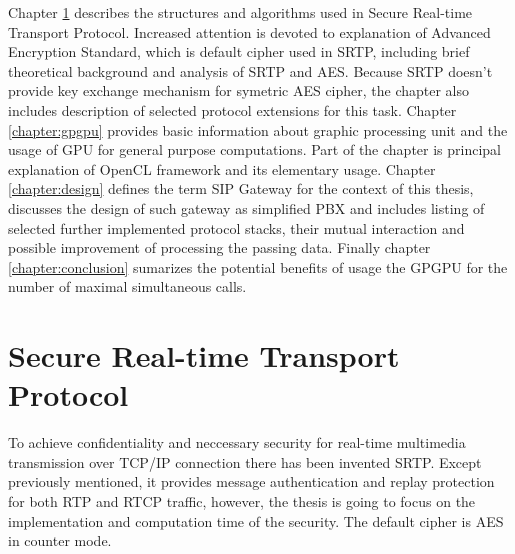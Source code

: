 Chapter \ref{chapter:srtp} describes the structures and algorithms used in 
Secure Real-time Transport Protocol. Increased attention is devoted to 
explanation of Advanced Encryption Standard, which is default cipher used in 
SRTP, including brief theoretical background and analysis of SRTP and AES. 
Because SRTP doesn't provide key exchange mechanism for symetric AES cipher, the
chapter also includes description of selected protocol extensions for this task.
Chapter \ref{chapter:gpgpu} provides basic information about graphic processing 
unit and the usage of GPU for general purpose computations. Part of the chapter 
is principal explanation of OpenCL framework and its elementary usage. 
Chapter \ref{chapter:design} defines the term SIP Gateway for the context of 
this thesis, discusses the design of such gateway as simplified PBX and includes
listing of selected further implemented protocol stacks, their mutual 
interaction and possible improvement of processing the passing data. 
Finally chapter \ref{chapter:conclusion} sumarizes the potential benefits of 
usage the GPGPU for the number of maximal simultaneous calls.









\chapter{Secure Real-time Transport Protocol}\label{chapter:srtp}
To achieve confidentiality and neccessary security for real-time multimedia
transmission over TCP/IP connection there has been invented SRTP\cite{
rfc3711}. Except previously mentioned, it provides message
authentication and replay protection for both RTP and RTCP traffic, 
however, the thesis is going to focus on the implementation and computation
time of the security. The default cipher is AES in counter mode.

